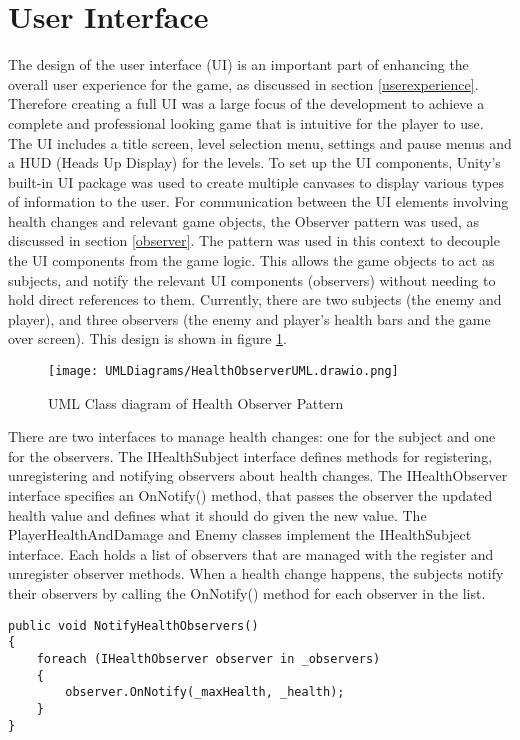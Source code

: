 \documentclass[10pt]{final_report}
\begin{document}
\section{User Interface}
The design of the user interface (UI) is an important part of enhancing the overall user experience for the game, as discussed in section \ref{userexperience}. Therefore creating a full UI was a large focus of the development to achieve a complete and professional looking game that is intuitive for the player to use. The UI includes a title screen, level selection menu, settings and pause menus and a HUD (Heads Up Display) for the levels.  \newline
To set up the UI components, Unity's built-in UI package was used \cite{unity2024_UI} to create multiple canvases to display various types of information to the user. 
For communication between the UI elements involving health changes and relevant game objects, the Observer pattern was used, as discussed in section \ref{observer}. The pattern was used in this context to decouple the UI components from the game logic. This allows the game objects to act as subjects, and notify the relevant UI components (observers) without needing to hold direct references to them. Currently, there are two subjects (the enemy and player), and three observers (the enemy and player's health bars and the game over screen). This design is shown in figure \ref{fig:label_observer1}.
\begin{figure}[H]
    \centering
    \texttt{[image: UMLDiagrams/HealthObserverUML.drawio.png]}
    \caption{UML Class diagram of Health Observer Pattern}
    \label{fig:label_observer1}
\end{figure}
There are two interfaces to manage health changes: one for the subject and one for the observers. The IHealthSubject interface defines methods for registering, unregistering and notifying observers about health changes. The IHealthObserver interface specifies an OnNotify() method, that passes the observer the updated health value and defines what it should do given the new value. 
The PlayerHealthAndDamage and Enemy classes implement the IHealthSubject interface. Each holds a list of observers that are managed with the register and unregister observer methods. When a health change happens, the subjects notify their observers by calling the OnNotify() method for each observer in the list.  
\begin{verbatim}
public void NotifyHealthObservers()
{
    foreach (IHealthObserver observer in _observers)
    {
        observer.OnNotify(_maxHealth, _health);
    }
}
\end{verbatim}
\end{document}
